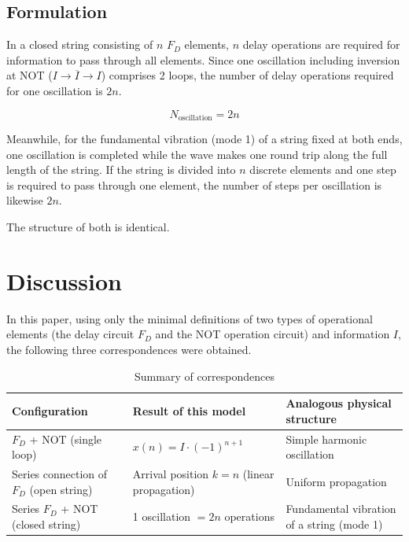 \documentclass[12pt,a4paper]{article}
\begin{document}
\subsection{Formulation}

In a closed string consisting of $n$ $F_D$ elements, $n$ delay operations are required for information to pass through all elements. Since one oscillation including inversion at NOT ($I \to \overline{I} \to I$) comprises 2 loops, the number of delay operations required for one oscillation is $2n$.

\begin{equation}
  N_{\text{oscillation}} = 2n
\end{equation}

Meanwhile, for the fundamental vibration (mode 1) of a string fixed at both ends, one oscillation is completed while the wave makes one round trip along the full length of the string. If the string is divided into $n$ discrete elements and one step is required to pass through one element, the number of steps per oscillation is likewise $2n$.

The structure of both is identical.

\section{Discussion}

In this paper, using only the minimal definitions of two types of operational elements (the delay circuit $F_D$ and the NOT operation circuit) and information $I$, the following three correspondences were obtained.

\begin{table}[htbp]
  \centering
  \caption{Summary of correspondences}
  \begin{tabular}{lll}
    \toprule
    Configuration & Result of this model & Analogous physical structure \\
    \midrule
    $F_D$ + NOT (single loop) & $x(n) = I \cdot (-1)^{n+1}$ & Simple harmonic oscillation \\
    Series connection of $F_D$ (open string) & Arrival position $k = n$ (linear propagation) & Uniform propagation \\
    Series $F_D$ + NOT (closed string) & 1 oscillation $= 2n$ operations & Fundamental vibration of a string (mode 1) \\
    \bottomrule
  \end{tabular}
\end{table}
\end{document}

